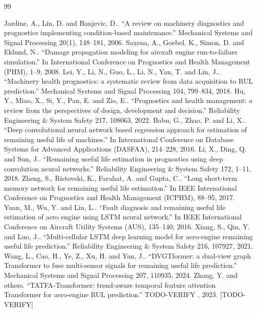 \begin{thebibliography}{99}

 Jardine, A., Lin, D. and Banjevic, D.. ``A review on machinery diagnostics and prognostics implementing condition-based maintenance.'' Mechanical Systems and Signal Processing 20(1), 148--181, 2006.
 Saxena, A., Goebel, K., Simon, D. and Eklund, N.. ``Damage propagation modeling for aircraft engine run-to-failure simulation.'' In International Conference on Prognostics and Health Management (PHM), 1--9, 2008.
 Lei, Y., Li, N., Guo, L., Li, N., Yan, T. and Lin, J.. ``Machinery health prognostics: a systematic review from data acquisition to RUL prediction.'' Mechanical Systems and Signal Processing 104, 799--834, 2018.
 Hu, Y., Miao, X., Si, Y., Pan, E. and Zio, E.. ``Prognostics and health management: a review from the perspectives of design, development and decision.'' Reliability Engineering \& System Safety 217, 108063, 2022.
 Babu, G., Zhao, P. and Li, X.. ``Deep convolutional neural network based regression approach for estimation of remaining useful life of machines.'' In International Conference on Database Systems for Advanced Applications (DASFAA), 214--228, 2016.
 Li, X., Ding, Q. and Sun, J.. ``Remaining useful life estimation in prognostics using deep convolution neural networks.'' Reliability Engineering \& System Safety 172, 1--11, 2018.
 Zheng, S., Ristovski, K., Farahat, A. and Gupta, C.. ``Long short-term memory network for remaining useful life estimation.'' In IEEE International Conference on Prognostics and Health Management (ICPHM), 88--95, 2017.
 Yuan, M., Wu, Y. and Lin, L.. ``Fault diagnosis and remaining useful life estimation of aero engine using LSTM neural network.'' In IEEE International Conference on Aircraft Utility Systems (AUS), 135--140, 2016.
 Xiang, S., Qin, Y. and Luo, J.. ``Multi-cellular LSTM deep learning model for aero-engine remaining useful life prediction.'' Reliability Engineering \& System Safety 216, 107927, 2021.
 Wang, L., Cao, H., Ye, Z., Xu, H. and Yan, J.. ``DVGTformer: a dual-view graph Transformer to fuse multi-sensor signals for remaining useful life prediction.'' Mechanical Systems and Signal Processing 207, 110935, 2024.
 Zhang, Y. and others. ``TATFA-Transformer: trend-aware temporal feature attention Transformer for aero-engine RUL prediction.'' TODO-VERIFY , 2023. [TODO-VERIFY]

\end{thebibliography}
